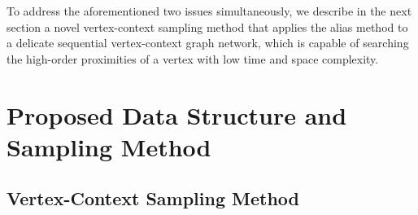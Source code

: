 To address the aforementioned two issues simultaneously, we describe in the next section a novel vertex-context sampling method that applies the alias method to a delicate sequential vertex-context graph network, which is capable of searching the high-order proximities of a vertex with low time and space complexity.










\section{Proposed Data Structure and Sampling Method}\label{sec_proposed} 


\subsection{Vertex-Context Sampling Method}\label{sec:vc}

